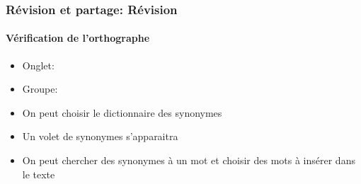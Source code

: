 \documentclass[xcolor=table]{beamer}
\begin{document}
\begin{frame}[t]
\frametitle{Révision et partage: Révision}
\framesubtitle{Vérification de l'orthographe}

\begin{minipage}{0.64\textwidth}
	\begin{itemize}
		\item Onglet: 
		\item Groupe: 
		\item On peut choisir le dictionnaire des synonymes  
		\item Un volet de synonymes s'apparaitra
		\item On peut chercher des synonymes à un mot et choisir des mots à insérer dans le texte 
	\end{itemize}
\end{minipage}
\begin{minipage}{0.35\textwidth}
	\begin{flushright}
	\end{flushright}

	\vspace{-12pt}
	
	
\end{minipage}

\end{frame}

\end{document}
